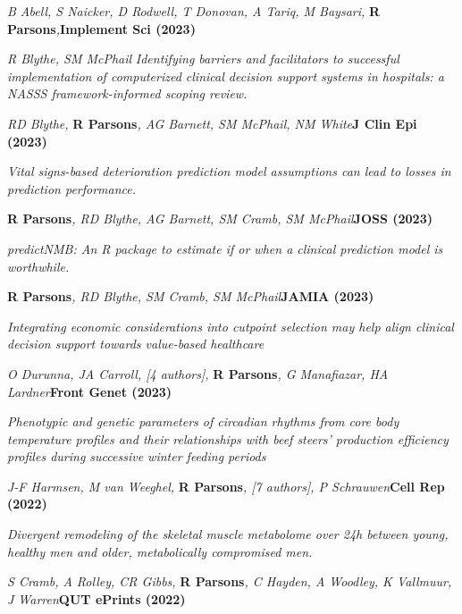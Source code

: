 \item
    \textit{B Abell, S Naicker, D Rodwell, T Donovan, A Tariq, M Baysari, }\textbf{R Parsons}\textit{,}\textbf{\hfill{Implement Sci (2023)}}\par\newline \textit{R Blythe, SM McPhail}\newline
    \textit{Identifying barriers and facilitators to successful implementation of computerized clinical decision support systems in hospitals: a NASSS framework-informed scoping review.}
\item
    \textit{RD Blythe, }\textbf{R Parsons}\textit{, AG Barnett, SM McPhail, NM White}\textbf{\hfill{J Clin Epi (2023)}}\par
    \textit{Vital signs-based deterioration prediction model assumptions can lead to losses in prediction performance.}
\item
    \textbf{R Parsons}\textit{, RD Blythe, AG Barnett, SM Cramb, SM McPhail}\textbf{\hfill{JOSS (2023)}}\par
    \textit{predictNMB: An R package to estimate if or when a clinical prediction model is worthwhile.}
\item
    \textbf{R Parsons}\textit{, RD Blythe, SM Cramb, SM McPhail}\textbf{\hfill{JAMIA (2023)}}\par
    \textit{
        Integrating economic considerations into cutpoint selection may help align clinical decision support \newline
        towards value-based healthcare
    }
\item
    \textit{O Durunna, JA Carroll, [4 authors], }\textbf{R Parsons}\textit{, G Manafiazar, HA Lardner}\textbf{\hfill{Front Genet (2023)}}\par
    \textit{
        Phenotypic and genetic parameters of circadian rhythms from core body temperature profiles and \newline
        their relationships with beef steers’ production efficiency profiles during successive winter feeding periods
    }
\item
    \textit{J-F Harmsen, M van Weeghel, }\textbf{R Parsons}\textit{, [7 authors], P Schrauwen}\textbf{\hfill{Cell Rep (2022)}}\par
    \textit{
        Divergent remodeling of the skeletal muscle metabolome over 24h between young, healthy men and older,\newline
        metabolically compromised men.
    }
\item
    \textit{S Cramb, A Rolley, CR Gibbs, }\textbf{R Parsons}\textit{, C Hayden, A Woodley, K Vallmuur, J Warren}\textbf{\hfill{QUT ePrints (2022)}}\par
